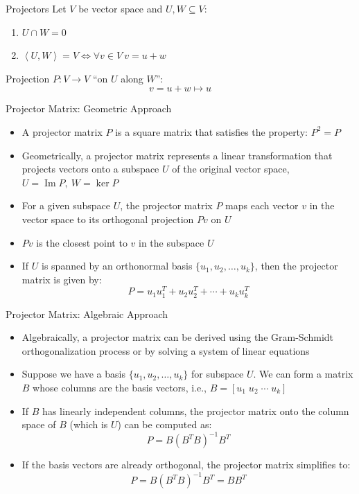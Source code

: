 \documentclass[fullscreen=true, bookmarks=true, hyperref={pdfencoding=unicode}]{beamer}
\begin{document}
\begin{frame}{Projectors}
  Let $V$ be vector space and $U, W \subseteq V$:
  \begin{enumerate}
    \item $U \cap W = 0$
    \item $\left< U, W \right> = V \Leftrightarrow \forall v \in V\ v = u + w$
  \end{enumerate}

  \vspace{1cm}
  \pause
  Projection $P: V \to V$ ``on $U$ along $W$'':
  $$v= u+w \mapsto u$$

\end{frame}


\begin{frame}{Projector Matrix: Geometric Approach}
  \begin{itemize}
    \item A projector matrix $P$ is a square matrix that satisfies the property: $P^2 = P$
    \item Geometrically, a projector matrix represents a linear transformation 
    that projects vectors onto a subspace $U$ of the original vector space, 
    $U = \operatorname{Im}P,\ W=\operatorname{ker}P$
    \item For a given subspace $U$, the projector matrix $P$ maps each vector $v$ 
    in the vector space to its orthogonal projection $Pv$ on $U$
    \pause
    \item $Pv$ is the closest point to $v$ in the subspace $U$
    \pause
    \item If $U$ is spanned by an orthonormal basis $\{u_1, u_2, \dots, u_k\}$, 
    then the projector matrix is given by:
      \[P = u_1u_1^T + u_2u_2^T + \cdots + u_ku_k^T\]
  \end{itemize}

\end{frame}

  
\begin{frame}{Projector Matrix: Algebraic Approach}
  \begin{itemize}
    \item Algebraically, a projector matrix can be derived using the Gram-Schmidt orthogonalization process or by solving a system of linear equations
    \item Suppose we have a basis $\{u_1, u_2, \dots, u_k\}$ for subspace $U$. 
    We can form a matrix $B$ whose columns are the basis vectors, i.e., $B = [u_1 \; u_2 \; \cdots \; u_k]$
    \item If $B$ has linearly independent columns, the projector matrix onto 
    the column space of $B$ (which is $U$) can be computed as:
      \[P = B(B^TB)^{-1}B^T\]
    \item If the basis vectors are already orthogonal, the projector matrix simplifies to:
      \[P = B(B^TB)^{-1}B^T = BB^T\]
  \end{itemize}
\end{frame}
\end{document}
